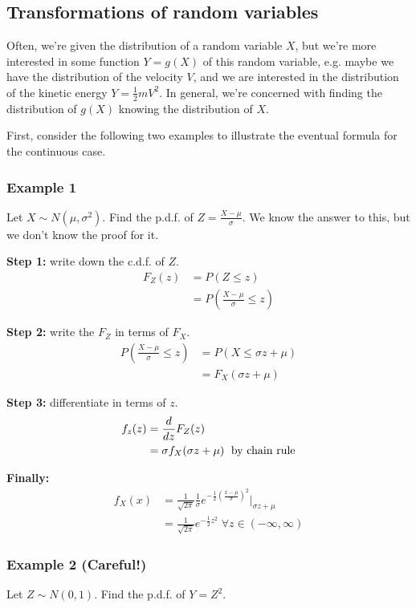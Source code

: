 \documentclass[12pt]{article}
\begin{document}
\subsection{Transformations of random variables}
Often, we're given the distribution of a random variable $X$, but we're more interested in some function $Y = g(X)$ of this random variable, e.g. maybe we have the distribution of the velocity $V$, and we are interested in the distribution of the kinetic energy $Y = \frac{1}{2} m V^2$. In general, we're concerned with finding the distribution of $g(X)$ knowing the distribution of $X$. 

First, consider the following two examples to illustrate the eventual formula for the continuous case. 

\subsubsection{Example 1}
Let $X \sim N(\mu, \sigma^2)$. Find the p.d.f. of $Z = \frac{X - \mu}{\sigma}$. We know the answer to this, but we don't know the proof for it.

\textbf{Step 1:} write down the c.d.f. of $Z$.
\begin{align*}
    F_Z (z) &= P(Z \leq z) \\
        &= P( \frac{X - \mu}{\sigma} \leq z)
\end{align*}

\textbf{Step 2:} write the $F_Z$ in terms of $F_X$.
\begin{align*} 
    P(\frac{X - \mu}{\sigma} \leq z) &= P(X \leq \sigma z + \mu) \\
        &= F_X (\sigma z + \mu)
\end{align*}

\textbf{Step 3:} differentiate in terms of $z$.
\begin{align*}
    f_z (z) &= \frac{d}{dz} F_Z (z) \\
        &= \sigma f_X (\sigma z + \mu) \; \textnormal{ by chain rule}
\end{align*}

\textbf{Finally:} 
\begin{align*}
    f_X (x) &= \frac{1}{\sqrt{2\pi}} \frac{1}{\sigma} e^{-\frac{1}{2} (\frac{x-\mu}{\sigma})^2} \Big|_{\sigma z + \mu} \\
        &= \frac{1}{\sqrt{2\pi}} e^{-\frac{1}{2} z^2} \; \forall z \in (-\infty, \infty)
\end{align*}

\subsubsection{Example 2 (Careful!)}
Let $Z \sim N(0,1)$. Find the p.d.f. of $Y=Z^2$.
\end{document}
